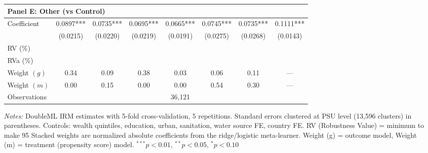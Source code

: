 \begin{table}[htbp]
\begin{tabular}{lccccccc}
\multicolumn{8}{l}{\textbf{Panel E: Other (vs Control)}} \\
\midrule
Coefficient & 0.0897*** & 0.0735*** & 0.0695*** & 0.0665*** & 0.0745*** & 0.0735*** & 0.1111*** \\
 & (0.0215) & (0.0220) & (0.0219) & (0.0191) & (0.0275) & (0.0268) & (0.0143) \\
RV (\%) \\
RVa (\%) \\
Weight $(g)$ & 0.34 & 0.09 & 0.38 & 0.03 & 0.06 & 0.11 & — \\
Weight $(m)$ & 0.00 & 0.15 & 0.00 & 0.00 & 0.54 & 0.30 & — \\

\midrule
Observations & \multicolumn{7}{c}{36,121} \\
\bottomrule
\end{tabular}
\begin{minipage}{\textwidth}
\footnotesize
\textit{Notes:} DoubleML IRM estimates with 5-fold cross-validation, 5 repetitions. 
Standard errors clustered at PSU level (13,596 clusters) in parentheses. 
Controls: wealth quintiles, education, urban, sanitation, water source FE, country FE. 
RV (Robustness Value) = minimum %
to make 95%
Stacked weights are normalized absolute coefficients from the ridge/logistic meta-learner. 
Weight (g) = outcome model, Weight (m) = treatment (propensity score) model. 
$^{***}p<0.01$, $^{**}p<0.05$, $^{*}p<0.10$
\end{minipage}
\end{table}